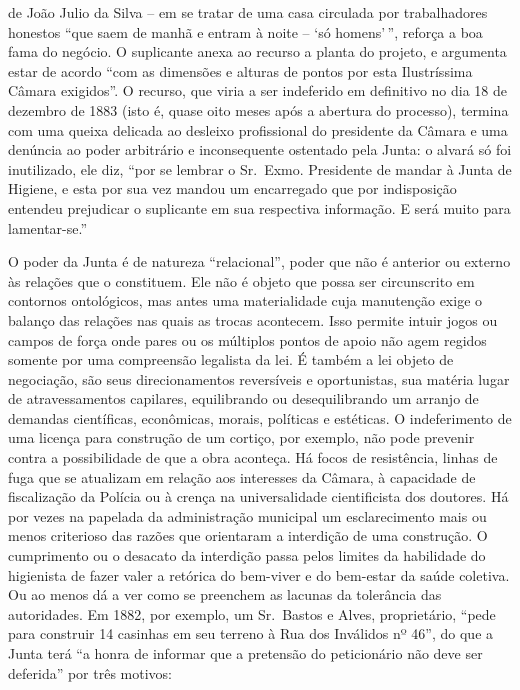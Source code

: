 de João Julio da Silva -- em se tratar de uma casa circulada por
trabalhadores honestos ``que saem de manhã e entram à noite -- `só
homens'\,'', reforça a boa fama do negócio. O suplicante anexa ao
recurso a planta do projeto, e argumenta estar de acordo ``com as
dimensões e alturas de pontos por esta Ilustríssima Câmara exigidos''. O
recurso, que viria a ser indeferido em definitivo no dia 18 de dezembro
de 1883 (isto é, quase oito meses após a abertura do processo), termina
com uma queixa delicada ao desleixo profissional do presidente da Câmara
e uma denúncia ao poder arbitrário e inconsequente ostentado pela Junta:
o alvará só foi inutilizado, ele diz, ``por se lembrar o Sr.~Exmo.
Presidente de mandar à Junta de Higiene, e esta por sua vez mandou um
encarregado que por indisposição entendeu prejudicar o suplicante em sua
respectiva informação. E será muito para lamentar-se.''

O poder da Junta é de natureza ``relacional'', poder que não é anterior
ou externo às relações que o constituem. Ele não é objeto que possa ser
circunscrito em contornos ontológicos, mas antes uma materialidade cuja
manutenção exige o balanço das relações nas quais as trocas acontecem.
Isso permite intuir jogos ou campos de força onde pares ou os múltiplos
pontos de apoio não agem regidos somente por uma compreensão legalista
da lei. É também a lei objeto de negociação, são seus direcionamentos
reversíveis e oportunistas, sua matéria lugar de atravessamentos
capilares, equilibrando ou desequilibrando um arranjo de demandas
científicas, econômicas, morais, políticas e estéticas. O indeferimento
de uma licença para construção de um cortiço, por exemplo, não pode
prevenir contra a possibilidade de que a obra aconteça. Há focos de
resistência, linhas de fuga que se atualizam em relação aos interesses
da Câmara, à capacidade de fiscalização da Polícia ou à crença na
universalidade cientificista dos doutores. Há por vezes na papelada da
administração municipal um esclarecimento mais ou menos criterioso das
razões que orientaram a interdição de uma construção. O cumprimento ou o
desacato da interdição passa pelos limites da habilidade do higienista
de fazer valer a retórica do bem-viver e do bem-estar da saúde coletiva.
Ou ao menos dá a ver como se preenchem as lacunas da tolerância das
autoridades. Em 1882, por exemplo, um Sr.~Bastos e Alves, proprietário,
``pede para construir 14 casinhas em seu terreno à Rua dos Inválidos nº
46'', do que a Junta terá ``a honra de informar que a pretensão do
peticionário não deve ser deferida'' por três motivos:

